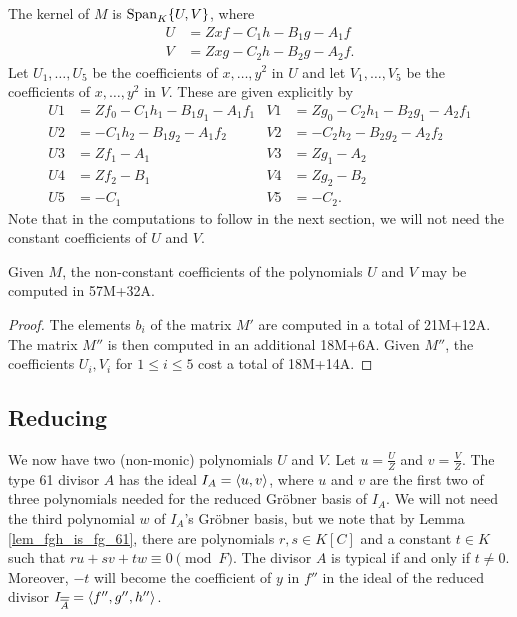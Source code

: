 The kernel of $M$ is $\operatorname{Span}_K\{U,V\}$, where
\begin{align*}
  U &= Zxf - C_1h - B_1g - A_1f \\
  V &= Zxg - C_2h - B_2g - A_2f.
\end{align*}
Let $U_1, \ldots, U_5$ be the coefficients of $x, \ldots, y^2$ in $U$
and let $V_1, \ldots, V_5$ be the coefficients of $x, \ldots, y^2$ in $V$.
These are given explicitly by
\begin{align*}
  U1 &= Zf_0 - C_1h_1 - B_1g_1 - A_1f_1 & V1 &= Zg_0 - C_2h_1 - B_2g_1 - A_2f_1 \\
  U2 &=      - C_1h_2 - B_1g_2 - A_1f_2 & V2 &=      - C_2h_2 - B_2g_2 - A_2f_2 \\
  U3 &= Zf_1 - A_1 & V3 &= Zg_1 - A_2 \\
  U4 &= Zf_2 - B_1 & V4 &= Zg_2 - B_2 \\
  U5 &=      - C_1 & V5 &=      - C_2.
\end{align*}
Note that in the computations to follow in the next section,
we will not need the constant coefficients of $U$ and $V$.

\begin{lemma}
  \label{lem_UV_op_count}
  Given $M$, the non-constant coefficients of the polynomials $U$ and $V$ may be computed in 57M+32A.
\end{lemma}
\begin{proof}
  The elements $b_i$ of the matrix $M'$ are computed in a total of 21M+12A.
  The matrix $M''$ is then computed in an additional 18M+6A.
  Given $M''$, the coefficients $U_i, V_i$ for $1 \leq i \leq 5$ cost a total of 18M+14A.
\end{proof}




\subsection{Reducing}
\label{sec_reducing}

We now have two (non-monic) polynomials $U$ and $V$.
Let $u = \frac U Z$ and $v = \frac V Z$.
The type 61 divisor $A$ has the ideal $I_A = \left\langle u, v \right\rangle$,
where $u$ and $v$ are the first two of three polynomials needed for the reduced Gr\"obner basis of $I_A$.
We will not need the third polynomial $w$ of $I_A$'s Gr\"obner basis,
but we note that by Lemma \ref{lem_fgh_is_fg_61},
there are polynomials $r,s \in K[C]$ and a constant $t \in K$
such that $ru + sv + tw \equiv 0 \pmod F$.
The divisor $A$ is typical if and only if $t \neq 0$.
Moreover, $-t$ will become the coefficient of $y$ in $f''$ in the ideal of the reduced divisor
$I_{\overline{\overline{A}}} = \left\langle f'', g'', h'' \right\rangle$.

